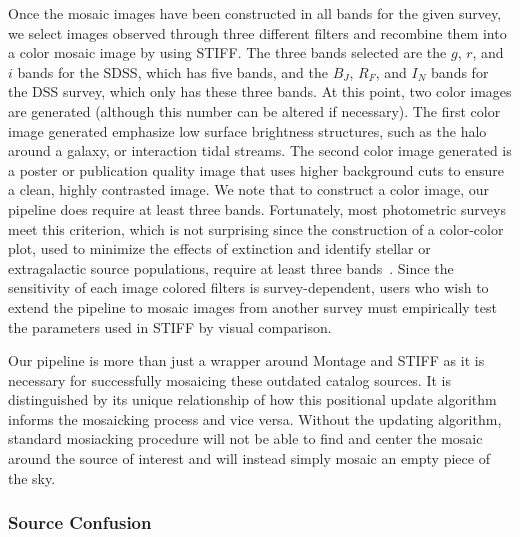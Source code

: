 \documentclass[authoryear, 12pt, 5p, times]{elsarticle}
\begin{document}
Once the mosaic images have been constructed in all bands for the given survey, we select images observed through three different filters and recombine them into a color mosaic image by using STIFF\label{sec:best_low}. The three bands selected are the $g$, $r$, and $i$ bands for the SDSS, which has five bands, and the $B_J$, $R_F$, and $I_N$ bands for the DSS survey, which only has these three bands. At this point, two color images are generated (although this number can be altered if necessary). The first color image generated emphasize low surface brightness structures, such as the halo around a galaxy, or interaction tidal streams. The second color image generated is a poster or publication quality image that uses higher background cuts to ensure a clean, highly contrasted image. We note that to construct a color image, our pipeline does require at least three bands. Fortunately, most photometric surveys meet this criterion, which is not surprising since the construction of a color-color plot, used to minimize the effects of extinction and identify stellar or extragalactic source populations, require at least three bands~\citep[see, e.g.,][]{2mass}. Since the sensitivity of each image  colored filters is survey-dependent, users who wish to extend the pipeline to mosaic images from another survey must empirically test the parameters used in STIFF by visual comparison.

Our pipeline is more than just a wrapper around Montage and STIFF as it is necessary for successfully mosaicing these outdated catalog sources. It is distinguished by its unique relationship of how this positional update algorithm informs the mosaicking process and vice versa. Without the updating algorithm, standard mosiacking procedure will not be able to find and center the mosaic around the source of interest and will instead simply mosaic an empty piece of the sky. 
\subsubsection{Source Confusion\label{sec:sc}}
\end{document}
